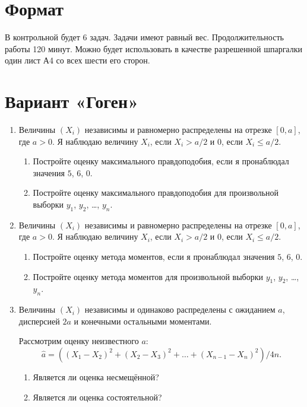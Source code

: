 \documentclass[12pt]{article}
\begin{document}
\section*{Формат}

В контрольной будет 6 задач.
Задачи имеют равный вес. 
Продолжительность работы 120 минут. 
Можно будет использовать в качестве разрешенной шпаргалки один лист А4 со всех шести его сторон.



\section*{Вариант «Гоген»}
\begin{enumerate}
    \item Величины $(X_i)$ независимы и равномерно распределены на отрезке $[0, a]$, где $a > 0$.
    Я наблюдаю величину $X_i$, если $X_i > a/2$ и $0$, если $X_i \leq a/2$.
    \begin{enumerate}
        \item Постройте оценку максимального правдоподобия, если я пронаблюдал значения $5$, $6$, $0$.
        \item Постройте оценку максимального правдоподобия для произвольной выборки $y_1$, $y_2$, \dots, $y_n$.
    \end{enumerate}
    
    \item Величины $(X_i)$ независимы и равномерно распределены на отрезке $[0, a]$, где $a > 0$.
    Я наблюдаю величину $X_i$, если $X_i > a/2$ и $0$, если $X_i \leq a/2$.
    \begin{enumerate}
        \item Постройте оценку метода моментов, если я пронаблюдал значения $5$, $6$, $0$.
        \item Постройте оценку метода моментов для произвольной выборки $y_1$, $y_2$, \dots, $y_n$.
    \end{enumerate}

    \item Величины $(X_i)$ независимы и одинаково распределены с ожиданием $a$, дисперсией $2a$ и конечными остальными моментами.
    
    Рассмотрим оценку неизвестного $a$:
    \[
 \hat a = ((X_1 - X_2)^2 + (X_2 - X_3)^2 + \dots + (X_{n-1} - X_{n})^2) / 4n.
    \]

    \begin{enumerate}
        \item Является ли оценка несмещённой?
        \item Является ли оценка состоятельной?
    \end{enumerate}


\end{enumerate}
\end{document}
